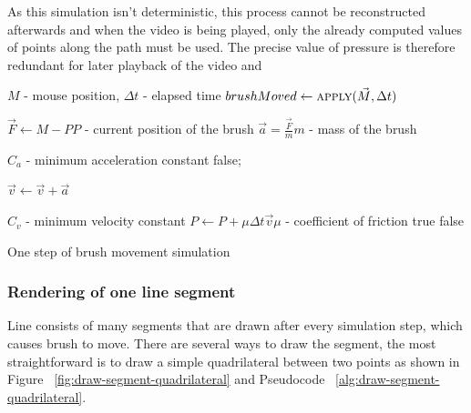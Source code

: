 As this simulation isn't deterministic, this process cannot be reconstructed afterwards and when the video is being played, only the already computed values of points along the path must be used. The precise value of pressure is therefore redundant for later playback of the video and 

\begin{pseudocode}
  \begin{algorithmic}

  	 \Comment $M$ - mouse position, $\Delta t$ - elapsed time
	      \State $brushMoved \gets \Call{apply}{\vec{M}, \Delta t} $
              \State {}
          \EndIf
      \EndIf
 	\EndFunction

      \State $ \vec{F} \gets M - P $\Comment $P$ - current position of the brush
      \State $ \vec{a} = \frac{\vec{F}}{m} $\Comment $m$ - mass of the brush

       \Comment $C_a$ - minimum acceleration constant
	      \State \Return false;    
       \EndIf
      
      \State $\vec{v} \gets \vec{v} + \vec{a}$

       \Comment $C_v$ - minimum velocity constant
          \State $ P \gets P + \mu\Delta t\vec{v} $\Comment $\mu$ - coefficient of friction
		  \State \Return true
      \EndIf
      \State \Return false
  	\EndFunction
  \end{algorithmic}
\caption{One step of brush movement simulation}
\label{alg:one-step}
\end{pseudocode}

\subsubsection*{Rendering of one line segment}

Line consists of many segments that are drawn after every simulation step, which causes brush to move. There are several ways to draw the segment, the most straightforward is to draw a simple quadrilateral between two points as shown in Figure ~\ref{fig:draw-segment-quadrilateral} and Pseudocode ~\ref{alg:draw-segment-quadrilateral}.

